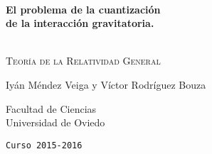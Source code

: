 \begin{titlepage}
\begin{center}


\HRule \\[0.4cm]
{ \huge \bfseries El problema de la cuantización\\de la interacción gravitatoria. \\[0.3cm] }

\HRule \\[1.5cm]

\textsc{\Large Teoría de la Relatividad General}\\[1cm]

\vfill

\large{\textsf{Iyán Méndez Veiga y Víctor Rodríguez Bouza}}


\textmd{Facultad de Ciencias \\
Universidad de Oviedo}

\texttt{Curso 2015-2016}



\end{center}
\end{titlepage}
